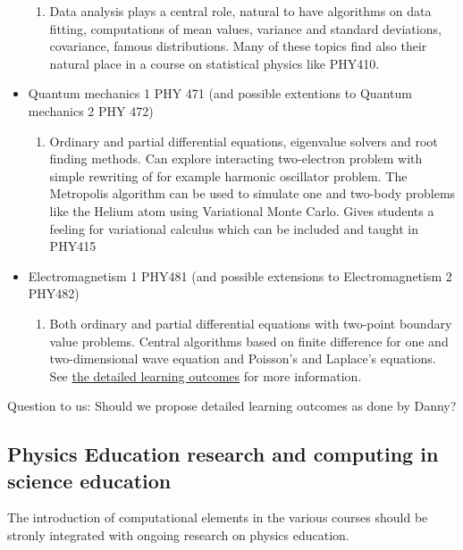 \documentclass[%
oneside,                 %
final,                   %
10pt]{article}
\begin{document}
\begin{itemize}
\begin{enumerate}
  \item Data analysis plays a central role, natural to have algorithms on data fitting, computations  of mean values, variance and standard deviations, covariance, famous distributions. Many of these topics find also their natural place in a course on statistical physics like PHY410.  

\end{enumerate}

\noindent
 \item Quantum mechanics 1  PHY 471 (and possible extentions to Quantum mechanics 2 PHY 472)
\begin{enumerate}

  \item Ordinary and partial differential equations, eigenvalue solvers and root finding methods. Can explore interacting two-electron problem with simple rewriting of for example harmonic oscillator problem. The Metropolis algorithm can be used to simulate one and two-body problems like the Helium atom using Variational Monte Carlo. Gives students a feeling for variational calculus which can be included and  taught in PHY415

\end{enumerate}

\noindent
 \item Electromagnetism 1 PHY481 (and possible extensions to Electromagnetism 2 PHY482)
\begin{enumerate}

  \item Both ordinary and partial differential equations with two-point boundary value problems. Central algorithms based on finite difference for one and two-dimensional wave equation and Poisson's and Laplace's equations. See \href{{https://dannycab.github.io/phy481msu/learning_goals.html}}{the detailed learning outcomes} for more information.
\end{enumerate}

\noindent
\end{itemize}

\noindent
Question to us: Should we propose detailed learning outcomes as done by Danny? 




\subsection*{Physics Education research and computing in science education}

The introduction of computational elements in the various courses should be stronly integrated with ongoing research on physics education.
\end{document}
